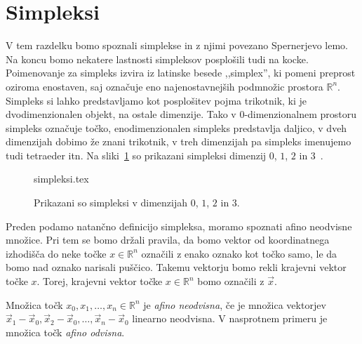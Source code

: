 \documentclass[mat1]{fmfdelo}
\newcommand{\R}{\mathbb R}
\newcommand{\0}{\underline{0}}
\def\citat#1{,,#1''}
\begin{document}
\section{Simpleksi}\label{raz:simpleksi}
V tem razdelku bomo spoznali simplekse in z njimi povezano Spernerjevo lemo. Na koncu bomo nekatere lastnosti simpleksov posplošili tudi na kocke. Poimenovanje za simpleks izvira iz latinske besede \citat{simplex}, ki pomeni preprost oziroma enostaven, saj označuje eno najenostavnejših podmnožic prostora $\R^n$.  Simpleks si lahko predstavljamo kot posplošitev pojma trikotnik, ki je dvodimenzionalen objekt, na ostale dimenzije. Tako v $0$-dimenzionalnem prostoru simpleks označuje točko, enodimenzionalen simpleks predstavlja daljico, v dveh dimenzijah dobimo že znani trikotnik, v treh dimenzijah pa simpleks imenujemo tudi tetraeder itn. Na sliki~\ref{fig:simplex} so prikazani simpleksi dimenzij $0$, $1$, $2$ in $3$~\cite{simplex}.
\begin{figure}[h!]  
	\centering
	{simpleksi.tex}%
	\caption{Prikazani so simpleksi v dimenzijah $0$, $1$, $2$ in $3$.}\label{fig:simplex}
\end{figure}
Preden podamo natančno definicijo simpleksa, moramo spoznati afino neodvisne množice. Pri tem se bomo držali pravila, da bomo vektor od koordinatnega izhodišča do neke točke $x \in \R^n$ označili z enako oznako kot točko samo, le da bomo nad oznako narisali puščico. Takemu vektorju bomo rekli krajevni vektor točke $x$. Torej, krajevni vektor točke $x \in \R^n$ bomo označili z $\vec{x}$.
\begin{definicija}
Množica točk $x_0, x_1, \dots , x_n \in \R^n$ je \emph{afino neodvisna}, če je množica vektorjev $\vec{x}_1 - \vec{x}_0, \vec{x}_2 - \vec{x}_0, \dots , \vec{x}_n - \vec{x}_0$ linearno neodvisna. V nasprotnem primeru je množica točk \emph{afino odvisna}.
\end{definicija}
\end{document}
